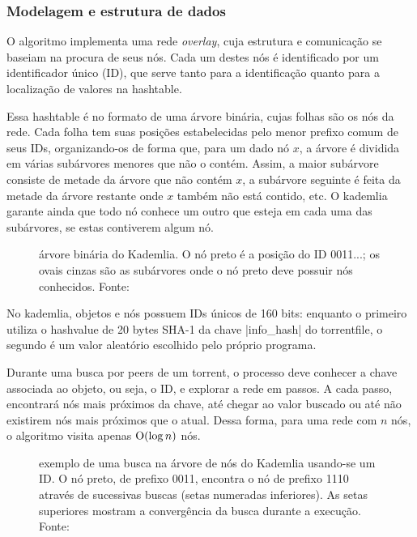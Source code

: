 
\subsubsection*{Modelagem e estrutura de dados}

O algoritmo implementa uma rede \emph{overlay}, cuja estrutura e comunicação se baseiam
na procura de seus nós. Cada um destes nós é identificado por um identificador único
(ID), que serve tanto para a identificação quanto para a localização de valores na
\gls*{hashtable}.

Essa \gls*{hashtable} é no formato de uma árvore binária, cujas folhas são os nós da
rede. Cada folha tem suas posições estabelecidas pelo menor prefixo comum de seus IDs,
organizando-os de forma que, para um dado nó $x$, a árvore é dividida em várias
subárvores menores que não o contém. Assim, a maior subárvore consiste de metade da
árvore que não contém $x$, a subárvore seguinte é feita da metade da árvore restante
onde $x$ também não está contido, etc. O \gls*{kademlia} garante ainda que todo nó
conhece um outro que esteja em cada uma das subárvores, se estas contiverem algum nó.

\begin{figure}[ht!]
    \centering
    \caption{árvore binária do Kademlia. O nó preto é a posição do ID 0011...; os ovais
    cinzas são as subárvores onde o nó preto deve possuir nós conhecidos. Fonte:
    \cite{artigo:kademlia}}
    \label{fig:dht-arvore}
\end{figure}

No \gls*{kademlia}, objetos e nós possuem IDs únicos de 160 bits: enquanto o primeiro
utiliza o \gls*{hashvalue} de 20 bytes SHA-1 da chave \bverb|info_hash| do
\gls*{torrentfile}, o segundo é um valor aleatório escolhido pelo próprio programa.

Durante uma busca por \glspl*{peer} de um \gls*{torrent}, o processo deve conhecer a
chave associada ao objeto, ou seja, o ID, e explorar a rede em passos. A cada passo,
encontrará nós mais próximos da chave, até chegar ao valor buscado ou até não existirem
nós mais próximos que o atual. Dessa forma, para uma rede com $n$ nós, o algoritmo
visita apenas $\textup{O}(\log n)$ nós.

\newpage
\begin{figure}[ht!]
    \centering
    \caption{exemplo de uma busca na árvore de nós do Kademlia usando-se um ID. O nó
    preto, de prefixo 0011, encontra o nó de prefixo 1110 através de sucessivas buscas
    (setas numeradas inferiores). As setas superiores mostram a convergência da
    busca durante a execução. Fonte: \cite{artigo:kademlia}}
    \label{fig:dht-arvore-busca}
\end{figure}

